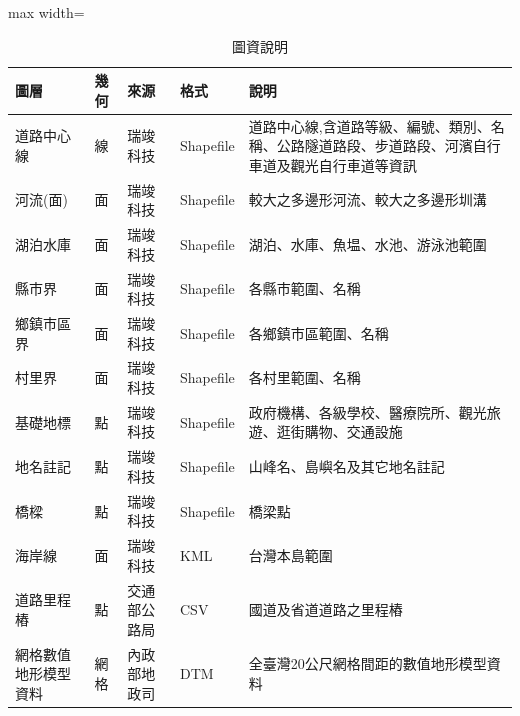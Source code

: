 \begin{table}[htbp]
\centering
\caption{圖資說明}
\label{tab:layer}
\begin{adjustbox}{max width=\textwidth}
\renewcommand{\arraystretch}{1.4}
\begin{tabular}{>{\centering\arraybackslash}m{2.5cm} >{\centering\arraybackslash}m{1cm} >{\centering\arraybackslash}m{2cm} >{\centering\arraybackslash}m{2cm} >{\arraybackslash}m{6.5cm}}
\toprule
圖層 & 幾何 & 來源 & 格式 & 說明 \\
\toprule
道路中心線 & 線 & 瑞竣科技 & Shapefile & 道路中心線,含道路等級、編號、類別、名稱、公路隧道路段、步道路段、河濱自行車道及觀光自行車道等資訊 \\
\hline
河流(面) & 面 & 瑞竣科技 &  Shapefile & 較大之多邊形河流、較大之多邊形圳溝 \\
\hline
湖泊水庫 & 面 & 瑞竣科技 &  Shapefile & 湖泊、水庫、魚塭、水池、游泳池範圍 \\
\hline
縣市界 & 面 & 瑞竣科技 &  Shapefile & 各縣市範圍、名稱 \\
\hline
鄉鎮市區界 & 面 & 瑞竣科技 &  Shapefile & 各鄉鎮市區範圍、名稱 \\
\hline
村里界 & 面 & 瑞竣科技 &  Shapefile & 各村里範圍、名稱 \\
\hline
基礎地標 & 點 & 瑞竣科技 &  Shapefile & 政府機構、各級學校、醫療院所、觀光旅遊、逛街購物、交通設施 \\
\hline
地名註記 & 點 & 瑞竣科技 &  Shapefile & 山峰名、島嶼名及其它地名註記 \\
\hline
橋樑 & 點 & 瑞竣科技 &  Shapefile & 橋梁點 \\
\hline
海岸線 & 面 & 瑞竣科技 & KML & 台灣本島範圍 \\
\hline
道路里程樁 & 點 & 交通部公路局 & CSV & 國道及省道道路之里程樁 \\
\hline
網格數值地形模型資料 & 網格 & 內政部地政司 & DTM & 全臺灣20公尺網格間距的數值地形模型資料 \\
\bottomrule
\end{tabular}
\end{adjustbox}
\end{table}